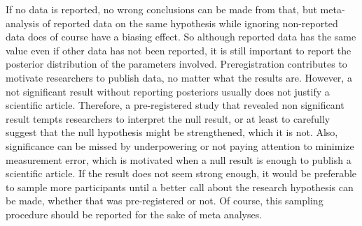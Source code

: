\documentclass[man]{apa7}
\theoremstyle{definition}
\begin{document}
If no data is reported, no wrong conclusions can be made from that, but meta-analysis of reported data on the same hypothesis while ignoring non-reported data does of course have a biasing effect. So although reported data has the same value even if other data has not been reported, it is still important to report the posterior distribution of the parameters involved. Preregistration contributes to motivate researchers to publish data, no matter what the results are. However, a not significant result without reporting posteriors usually does not justify a scientific article. Therefore, a pre-registered study that revealed non significant result tempts researchers to interpret the null result, or at least to carefully suggest that the null hypothesis might be strengthened, which it is not. Also, significance can be missed by underpowering or not paying attention to minimize measurement error, which is motivated when a null result is enough to publish a scientific article. If the result does not seem strong enough, it would be preferable to sample more participants until a better call about the research hypothesis can be made, whether that was pre-registered or not. Of course, this sampling procedure should be reported for the sake of meta analyses.
\end{document}
